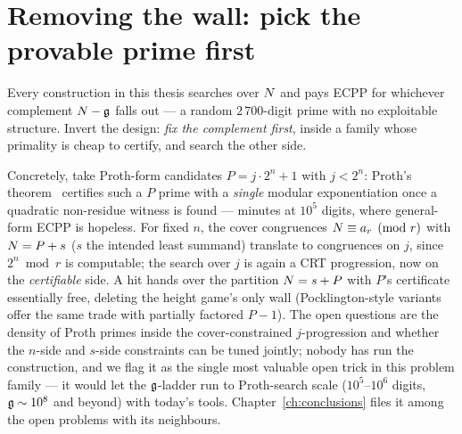 \section{Removing the wall: pick the provable prime first}\label{sec:twosided}

Every construction in this thesis searches over $N$ and pays ECPP for
whichever complement $N-\mathfrak{g}$ falls out --- a random $2\,700$-digit
prime with no exploitable structure. Invert the design: \emph{fix the
complement first}, inside a family whose primality is cheap to
certify, and search the other side.

Concretely, take Proth-form candidates $P=j\cdot2^n+1$ with
$j<2^n$: Proth's theorem~\cite{Proth} certifies such a $P$ prime with a
\emph{single} modular exponentiation once a quadratic non-residue
witness is found --- minutes at $10^5$ digits, where general-form ECPP
is hopeless. For fixed $n$, the cover congruences
$N\equiv a_r\pmod r$ with $N=P+s$ ($s$ the intended least summand)
translate to congruences on $j$, since $2^n\bmod r$ is computable; the
search over $j$ is again a CRT progression, now on the \emph{certifiable}
side. A hit hands over the partition $N=s+P$ with $P$'s certificate
essentially free, deleting the height game's only wall
(Pocklington-style variants~\cite{Pocklington} offer the same trade
with partially factored $P-1$). The open questions are the density of
Proth primes inside the cover-constrained $j$-progression and whether
the $n$-side and $s$-side constraints can be tuned jointly; nobody has
run the construction, and we flag it as the single most valuable open
trick in this problem family --- it would let the $\mathfrak{g}$-ladder run to
Proth-search scale ($10^5$--$10^6$ digits, $\mathfrak{g}\sim10^8$ and beyond)
with today's tools. Chapter~\ref{ch:conclusions} files it among the
open problems with its neighbours.
